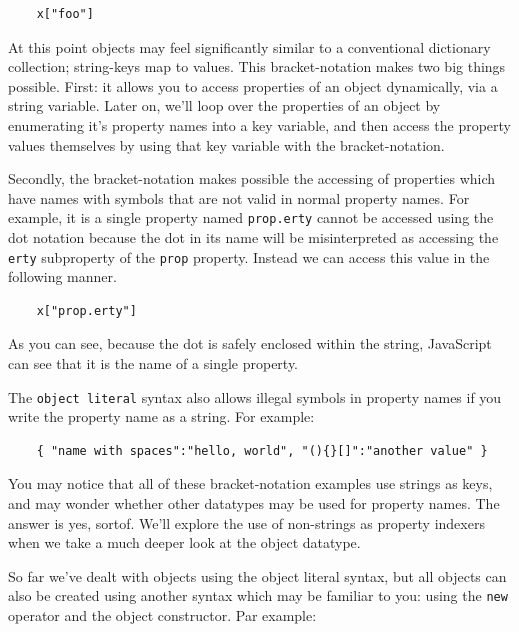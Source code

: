 \documentclass[11pt,letter]{book}
\begin{document}
    \begin{verbatim}
    x["foo"]
    \end{verbatim}
    
    At this point objects may feel significantly similar to a conventional dictionary collection;
    string-keys map to values. This bracket-notation makes two big things possible. First: it allows 
    you to access properties of an object dynamically, via a string variable. Later on, we'll loop
    over the properties of an object by enumerating it's property names into a key variable, and 
    then access the property values themselves by using that key variable with the bracket-notation.
    
    Secondly, the bracket-notation makes possible the accessing of properties which have names with 
    symbols that are not valid in normal property names. For example, it is a single property named 
    \texttt{prop.erty} cannot be accessed using the dot notation because the dot in its name will be
    misinterpreted as accessing the \texttt{erty} subproperty of the \texttt{prop} property. Instead
    we can access this value in the following manner.
    
    \begin{verbatim}
    x["prop.erty"]
    \end{verbatim}
    
    As you can see, because the dot is safely enclosed within the string, JavaScript can see that it 
    is the name of a single property.
    
    The \texttt{object literal} syntax also allows illegal symbols in property names if you write
    the property name as a string. For example:
    
    \begin{verbatim}
    { "name with spaces":"hello, world", "(){}[]":"another value" }
    \end{verbatim}
    
    You may notice that all of these bracket-notation examples use strings as keys, and may wonder
    whether other datatypes may be used for property names. The answer is yes, sortof. We'll explore 
    the use of non-strings as property indexers when we take a much deeper look at the object 
    datatype.
    
    So far we've dealt with objects using the object literal syntax, but all objects can also be 
    created using another syntax which may be familiar to you: using the \texttt{new} operator and 
    the object constructor. Par example:
    
\end{document}
